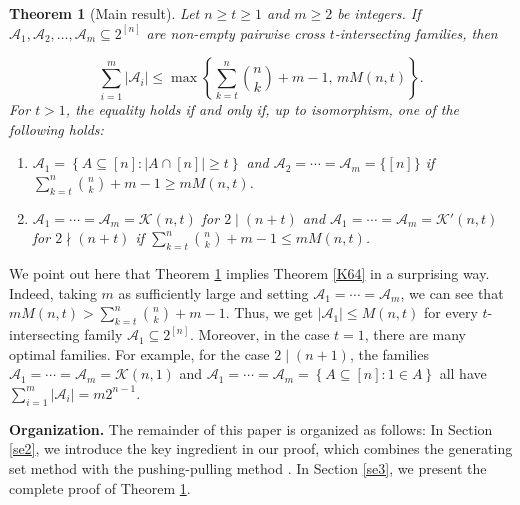 \documentclass[11pt,a4paper]{article}
\newtheorem{theorem}{Theorem}[section]
\begin{document}
\begin{theorem}[Main result] \label{ma1}
Let $ n\geq  t\geq  1$ and $ m\geq  2$ be  integers. If $ \mathcal{A}_1, \mathcal{A}_2, \ldots, \mathcal{A}_m \subseteq 2^{[n]}$ are non-empty pairwise cross $t$-intersecting families, then

$$
\sum_{i=1}^m |\mathcal{A}_i| \leq \max \left\{ \sum_{k=t} ^{n}\binom{n}{k}  + m - 1, \, m M(n, t) \right\}.
$$
For $t>1$, the equality holds if and only if, up to isomorphism, one of the following holds:
\begin{enumerate}
    \item[\rm (a)]  $\mathcal{A}_1=\left\{A \subseteq [n]:|A \cap[n]| \geq  t\right\}$ and $\mathcal{A}_2=\cdots= \mathcal{A}_m=\{[n]\}$ if $\sum_{k=t} ^{n}\binom{n}{k}  + m - 1\geq  m M(n, t)$.

\item[\rm (b)]  $\mathcal{A}_1=\cdots= \mathcal{A}_m= \mathcal{K}(n,t)$ for $2\mid (n+t)$  and $\mathcal{A}_1=\cdots= \mathcal{A}_m= \mathcal{K}'(n,t)$ for $2\nmid (n+t)$ if $\sum_{k=t} ^{n}\binom{n}{k}  + m - 1\leq m M(n, t)$.
\end{enumerate}
\end{theorem}

We point out here that Theorem \ref{ma1} implies 
Theorem \ref{K64} in a surprising way. Indeed, taking $m$ as sufficiently large and setting $\mathcal{A}_1= \cdots = \mathcal{A}_m$, we can see that $m M(n,t) > 
\sum_{k=t}^n {n \choose k} + m-1$. Thus, we get $|\mathcal{A}_1| \leq M(n,t)$ for every $t$-intersecting family $\mathcal{A}_1\subseteq 2^{[n]}$. 
Moreover, in the case $t=1$, there are many optimal families. For example, for the case $2\mid (n+1)$, the families $\mathcal{A}_1=\cdots= \mathcal{A}_m= \mathcal{K}(n,1)$  and $\mathcal{A}_1=\cdots= \mathcal{A}_m= \left\{A \subseteq [n]:1\in A\right\}$ all have $\sum_{i=1}^m |\mathcal{A}_i|=m2^{n-1}$.

  \medskip 
\noindent 
{\bf Organization.} 
 The remainder of this paper is organized as follows: In Section \ref{se2}, we introduce the key ingredient in our proof, which combines the generating set method \cite{AK1997} with the pushing-pulling method \cite{AK1999}. In Section \ref{se3}, we present the complete proof of Theorem \ref{ma1}. 
\end{document}
